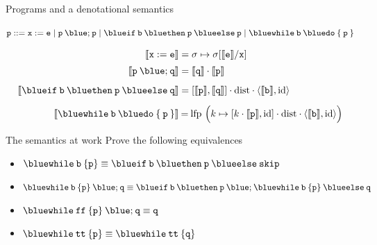 \documentclass{beamer}
\begin{document}
\begin{frame}{Programs and a denotational semantics}
        \begin{block}{\vspace*{-3.5ex}}
        \begin{center}
        $\prog{p} ::= \mathtt{x} := \mathtt{e} \mid
	\mathtt{p \> {\blue ;} \> p} \mid
	\mathtt{{\blue if} \> b \> {\blue then} \> p \> {\blue else} \> p} \mid
	\mathtt{{\blue while} \> b \> {\blue do} \> \{ \> p \> \}}$
        \end{center}
	\end{block}
        \vspace{-0.5cm}
        \begin{align*}
                \sem{\prog{x : = e}} & = \sigma \mapsto \sigma[\sem{\prog{e}}/\prog{x}] \\[2pt]
                \sem{\prog{p} \> {\blue ;} \> \prog{q}} & 
                = \sem{\prog{q}} \comp \sem{\prog{p}} \\[5pt]
                \sem{\mathtt{{\blue if} \> b \> {\blue then} \> p \> {\blue else} \> q}}
                                                        & 
                                                        = [\sem{\prog{p}},\sem{\prog{q}}] \comp
                                                        \mathrm{dist} \comp \pv{\sem{\prog{b}}}{\id}
                                                        \\[5pt]
                \sem{\mathtt{{\blue while} \> b \> {\blue do} \> \{ \> p \> \}} }
                                                        & \> {=} \> \mathrm{lfp}\ \Big (k \mapsto
                [k \comp 
                \sem{\prog{p}},\id] \comp
                \mathrm{dist} \comp \pv{\sem{\prog{b}}}{\id} \Big )
        \end{align*}
\end{frame}

\begin{frame}{The semantics at work}
        Prove the following equivalences
        \begin{itemize}
                \item $\mathtt{{\blue while} \> b \> \{ p \} } \equiv
                      \mathtt{{\blue if} \> b \> {\blue then} \> p \> {\blue else} \> skip}$
                \item $\mathtt{{\blue while} \> b \> \{ p \} } \> {\blue ;} \> \mathtt{q} \equiv
                      \mathtt{{\blue if} \> b \> {\blue then} \> p \> {\blue ;}  \> {\blue while} \> b \> \{ p \}
                      \> {\blue else} \> q}$
                \item $\mathtt{{\blue while} \> ff \> \{ p \} \> {\blue ;} \> q } \equiv \mathtt{q}$
                \item $\mathtt{{\blue while} \> tt \> \{ p \} } \equiv
                      \mathtt{{\blue while} \> tt \> \{ q \} }$

        \end{itemize}

\end{frame}
\end{document}
